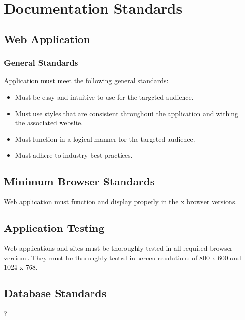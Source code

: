 \section{Documentation Standards}

\subsection{Web Application}

\subsubsection{General Standards}

Application must meet the following general standards:

\begin{itemize}
\item Must be easy and intuitive to use for the targeted audience.
\item Must use styles that are consistent throughout the application and withing the associated website.
\item Must function in a logical manner for the targeted audience.
\item Must adhere to industry best practices.
\end{itemize}

\subsection{Minimum Browser Standards}

Web application must function and display properly in the x browser versions.

\subsection{Application Testing}
Web applications and sites must be thoroughly tested in all required browser versions.  They must be thoroughly tested in screen resolutions of 800 x 600 and 1024 x 768.

\subsection{Database Standards}
?